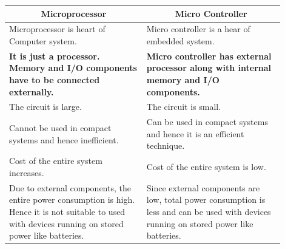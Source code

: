 \documentclass[a4paper]{article}
\begin{document}
\begin{enumerate}[label = \arabic*.]
      \begin{table}[H]
        \centering
        \begin{tabular}{p{0.45\linewidth} p{0.45\linewidth}}
          \toprule
          \multicolumn{1}{c}{\textbf{Microprocessor}}                                                                                                             & \multicolumn{1}{c}{\textbf{Micro Controller}}                                                                                                    \\
          \midrule
          Microprocessor is heart of Computer system.                                                                                                             & Micro controller is a hear of embedded system.                                                                                                   \\
          \midrule
          \textbf{It is just a processor. Memory and I/O components have to be connected externally.}                                                             & \textbf{Micro controller has external processor along with internal memory and I/O components.}                                                  \\
          \midrule
          The circuit is large.                                                                                                                                   & The circuit is small.                                                                                                                            \\
          \midrule
          Cannot be used in compact systems and hence inefficient.                                                                                                & Can be used in compact systems and hence it is an efficient technique.                                                                           \\
          \midrule
          Cost of the entire system increases.                                                                                                                    & Cost of the entire system is low.                                                                                                                \\
          \midrule
          Due to external components, the entire power consumption is high. Hence it is not suitable to used with devices running on stored power like batteries. & Since external components are low, total power consumption is less and can be used with devices running on stored power like batteries.          \\

\end{tabular}
\end{table}
\end{enumerate}
\end{document}
